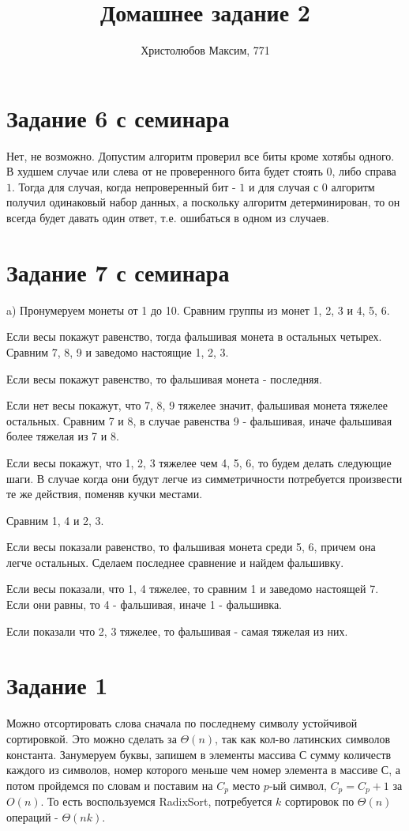 \documentclass[a4paper,12pt]{article}
\author{Христолюбов Максим, 771}
\title{Домашнее задание 2}
\date{ }
\begin{document}

\maketitle

\section*{Задание 6 с семинара}  
\hspace{0.5cm}
Нет, не возможно. Допустим алгоритм проверил все биты кроме хотябы одного. В худшем случае или слева от не проверенного бита будет стоять $0$, либо справа $1$. Тогда для случая, когда непроверенный бит - $1$ и для случая с $0$ алгоритм получил одинаковый набор данных, а поскольку алгоритм детерминирован, то он всегда будет давать один ответ, т.е. ошибаться в одном из случаев.

\section*{Задание 7 с семинара}  
\hspace{0.5cm}
a) Пронумеруем монеты от 1 до 10. Сравним группы из монет 1, 2, 3 и 4, 5, 6.

Если весы покажут равенство, тогда фальшивая монета в остальных четырех. Сравним 7, 8, 9 и заведомо настоящие 1, 2, 3. 

Если весы покажут равенство, то фальшивая монета - последняя. 

Если нет весы покажут, что 7, 8, 9 тяжелее значит, фальшивая монета тяжелее остальных. Сравним 7 и 8, в случае равенства 9 - фальшивая,  иначе фальшивая более тяжелая из 7 и 8.

Если весы покажут, что 1, 2, 3 тяжелее чем 4, 5, 6, то будем делать следующие шаги. В случае когда они будут легче из симметричности потребуется произвести те же действия, поменяв кучки местами.

Сравним 1, 4 и 2, 3. 

Если весы показали равенство, то фальшивая монета среди 5, 6, причем она легче остальных. Сделаем последнее сравнение и найдем фальшивку. 

Если весы показали, что 1, 4 тяжелее, то сравним 1 и заведомо настоящей 7. Если они равны, то 4 - фальшивая, иначе 1 - фальшивка. 

Если показали что 2, 3 тяжелее, то фальшивая - самая тяжелая из них.

\section*{Задание 1}
\hspace{0.5cm}
Можно отсортировать слова сначала по последнему символу устойчивой сортировкой. Это можно сделать за $\Theta(n)$, так как кол-во латинских символов константа. Занумеруем буквы, запишем в элементы массива С сумму количеств каждого из символов, номер которого меньше чем номер элемента в массиве С, а потом пройдемся по словам и поставим на $C_{p}$ место $p$-ый символ, $C_{p}=C_{p}+1$ за $O(n)$. То есть воспользуемся RadixSort, потребуется $k$ сортировок по $\Theta(n)$ операций - $\Theta(nk)$.
\end{document}
